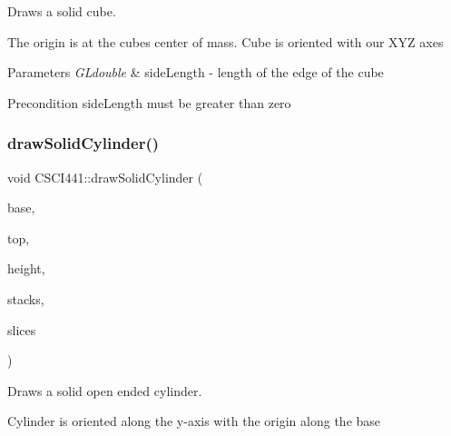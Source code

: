 Draws a solid cube. 

The origin is at the cube\textquotesingle{}s center of mass. Cube is oriented with our X\+YZ axes


\begin{DoxyParams}{Parameters}
{\em G\+Ldouble} & side\+Length -\/ length of the edge of the cube \\
\hline
\end{DoxyParams}
\begin{DoxyPrecond}{Precondition}
side\+Length must be greater than zero 
\end{DoxyPrecond}
\mbox{\label{namespace_c_s_c_i441_ae5fbc355c04fd762dcdda56a1954e2c6}} 
\subsubsection{\texorpdfstring{draw\+Solid\+Cylinder()}{drawSolidCylinder()}}
{\footnotesize\ttfamily void C\+S\+C\+I441\+::draw\+Solid\+Cylinder (\begin{DoxyParamCaption}\item[{G\+Ldouble}]{base,  }\item[{G\+Ldouble}]{top,  }\item[{G\+Ldouble}]{height,  }\item[{G\+Lint}]{stacks,  }\item[{G\+Lint}]{slices }\end{DoxyParamCaption})\hspace{0.3cm}{\ttfamily [inline]}}



Draws a solid open ended cylinder. 

Cylinder is oriented along the y-\/axis with the origin along the base


